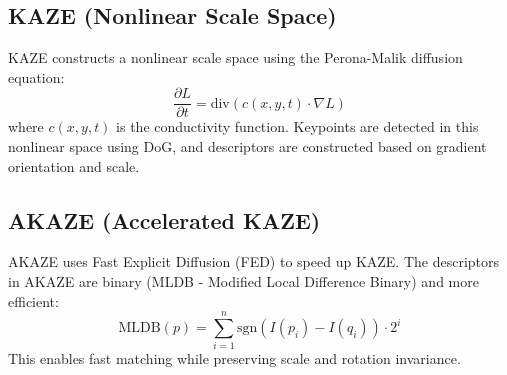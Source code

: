 \subsection{KAZE (Nonlinear Scale Space)}
KAZE \cite{KAZE} constructs a nonlinear scale space using the Perona-Malik diffusion equation:
\begin{equation}
\frac{\partial L}{\partial t} = \text{div}(c(x, y, t) \cdot \nabla L)
\end{equation}
where $c(x,y,t)$ is the conductivity function. Keypoints are detected in this nonlinear space using DoG, and descriptors are constructed based on gradient orientation and scale.

\subsection{AKAZE (Accelerated KAZE)}
AKAZE \cite{KAZE} uses Fast Explicit Diffusion (FED) to speed up KAZE. The descriptors in AKAZE are binary (MLDB - Modified Local Difference Binary) and more efficient:
\begin{equation}
\text{MLDB}(p) = \sum_{i=1}^{n} \text{sgn}(I(p_i) - I(q_i)) \cdot 2^i
\end{equation}
This enables fast matching while preserving scale and rotation invariance.
